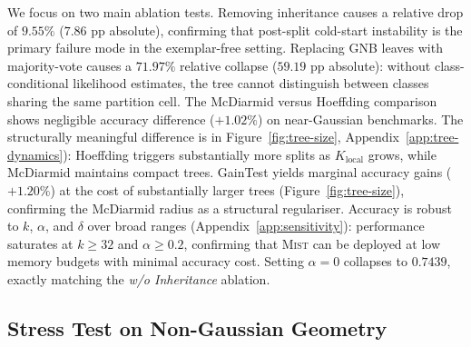 \documentclass{article}
\newcommand{\mist}{\textsc{Mist}}
\begin{document}
We focus on two main ablation tests. Removing inheritance causes a relative drop of
$9.55\%$ ($7.86$ pp absolute), confirming that post-split cold-start
instability is the primary failure mode in the exemplar-free setting.
Replacing GNB leaves with majority-vote causes a $71.97\%$ relative
collapse ($59.19$ pp absolute): without class-conditional likelihood
estimates, the tree cannot distinguish between classes sharing the same
partition cell.
The McDiarmid versus Hoeffding comparison shows negligible accuracy difference
($+1.02\%$) on near-Gaussian benchmarks. The structurally meaningful difference is 
in Figure~\ref{fig:tree-size}, 
Appendix~\ref{app:tree-dynamics}): Hoeffding triggers substantially
more splits as $K_{\mathrm{local}}$ grows, while McDiarmid maintains compact
trees. 
GainTest yields marginal accuracy gains ($+1.20\%$) at the cost of
substantially larger trees (Figure~\ref{fig:tree-size}), confirming the
McDiarmid radius as a structural regulariser.
Accuracy is robust to $k$, $\alpha$, and $\delta$ over broad ranges
(Appendix~\ref{app:sensitivity}): performance saturates at $k \geq 32$ and
$\alpha \geq 0.2$, confirming that \mist{} can be deployed at low memory
budgets with minimal accuracy cost. Setting $\alpha = 0$ collapses to
$0.7439$, exactly matching the \emph{w/o Inheritance} ablation.

\subsection{Stress Test on Non-Gaussian Geometry}
\label{sec:stress}
\end{document}
